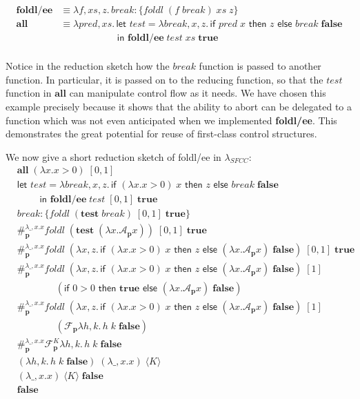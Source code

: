 \documentclass[11pt]{article}
\newcommand\x{\lambda x}
\newcommand{\letin}[2]{\textsf{let }#1\textsf{ in }#2}
\newcommand\F{\mathcal{F}}
\newcommand\A{\mathcal{A}}
\newcommand{\angles}[1]{\langle#1\rangle}
\begin{document}
\begin{align*}
\textbf{foldl/ee} &\equiv
	\lambda f, xs, z.\,break\!: \{foldl\;(f\;break)\;xs\;z\} \\
\textbf{all} &\equiv
	\lambda pred,xs.\, \letin{test =
		\lambda break,x,z.\,\textsf{if }pred\;x
		\textsf{ then }z\textsf{ else }break\;\textbf{false}
	\\&\qquad\qquad\quad\;\;}{\textbf{foldl/ee}\;test\;xs\;\textbf{true}} \\
\end{align*}

Notice in the reduction sketch how the $break$ function is passed to another function.
In particular, it is passed on to the reducing function, so that the $test$ function in $\textbf{all}$ can manipulate control flow as it needs.
We have chosen this example precisely because it shows that the ability to abort can be delegated to a function which was not even anticipated when we implemented \textbf{foldl/ee}.
This demonstrates the great potential for reuse of first-class control structures.

We now give a short reduction sketch of foldl/ee in $\lambda_{SFCC}$:
\begin{align*}
&\textbf{all}\;(\x.x>0)\;[0, 1] \\
%
&\letin{test =
	\lambda break,x,z.\,\textsf{if }(\x.x>0)\;x
	\textsf{ then }z\textsf{ else }break\;\textbf{false}
\\&\qquad}{\textbf{foldl/ee}\;test\;[0,1]\;\textbf{true}} \\
%
&break\!: \{foldl\;(\textbf{test}\;break)\;[0,1]\;\textbf{true}\} \\
%
&\#_\textbf{p}^{\lambda\_,x.x}
	foldl\;(\textbf{test}\;(\x.\A_\textbf{p}x))\;[0,1]\;\textbf{true} \\
%
&\#_\textbf{p}^{\lambda\_,x.x}
	foldl\;(\x,z.\,\textsf{if }(\x.x>0)\;x
	\textsf{ then }z\textsf{ else }(\x.\A_\textbf{p}x)\;\textbf{false})\;[0,1]\;\textbf{true} \\
%
&\#_\textbf{p}^{\lambda\_,x.x}
	foldl\;(\x,z.\,\textsf{if }(\x.x>0)\;x
	\textsf{ then }z\textsf{ else }(\x.\A_\textbf{p}x)\;\textbf{false})\;[1] \\
		&\qquad\qquad(\textsf{if }0>0\textsf{ then }\textbf{true}\textsf{ else }(\x.\A_\textbf{p}x)\;\textbf{false}) \\
%
&\#_\textbf{p}^{\lambda\_,x.x}
	foldl\;(\x,z.\,\textsf{if }(\x.x>0)\;x
	\textsf{ then }z\textsf{ else }(\x.\A_\textbf{p}x)\;\textbf{false})\;[1] \\
		&\qquad\qquad(\F_\textbf{p}\lambda h,k.\,h\;k\;\textbf{false}) \\
%
&\#_\textbf{p}^{\lambda\_,x.x}\F_\textbf{p}^K\lambda h,k.\,h\;k\;\textbf{false} \\
%
&(\lambda h,k.\,h\;k\;\textbf{false})\;(\lambda\_,x.x)\;\angles K \\
%
&(\lambda\_,x.x)\;\angles K\;\textbf{false} \\
%
&\textbf{false} \\
\end{align*}
\end{document}
